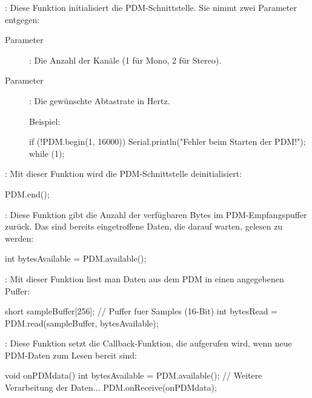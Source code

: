 \begin{description}
  \item []: Diese Funktion initialisiert die PDM-Schnittstelle. Sie nimmt zwei Parameter entgegen:
    \begin{description}
      \item[Parameter ]: Die Anzahl der Kanäle (1 für Mono, 2 für Stereo).
      \item[Parameter ]: Die gewünschte Abtastrate in Hertz.
      
       Beispiel:
       
 \begin{Arduino}
if (!PDM.begin(1, 16000)) {
    Serial.println("Fehler beim Starten der PDM!");
    while (1);
}
 \end{Arduino}      
    \end{description}

  \item []: Mit dieser Funktion wird die PDM-Schnittstelle deinitialisiert:
  
 \begin{Arduino}
PDM.end();
 \end{Arduino}      

  \item 
  
    \item [\PYTHON{available()}]: Diese Funktion gibt die Anzahl der verfügbaren Bytes im PDM-Empfangspuffer zurück. Das sind bereits eingetroffene Daten, die darauf warten, gelesen zu werden:

 \begin{Arduino}
int bytesAvailable = PDM.available();
 \end{Arduino}      
  
  \item [\PYTHON{read()}]: Mit dieser Funktion liest man Daten aus dem PDM in einen angegebenen Puffer:
  
 \begin{Arduino}
  short sampleBuffer[256]; // Puffer fuer Samples (16-Bit)
  int bytesRead = PDM.read(sampleBuffer, bytesAvailable);
 \end{Arduino}      
  
  \item [\PYTHON{onReceive()}]: Diese Funktion setzt die Callback-Funktion, die aufgerufen wird, wenn neue PDM-Daten zum Lesen bereit sind:
  
 \begin{Arduino}
void onPDMdata() {
      int bytesAvailable = PDM.available();
      // Weitere Verarbeitung der Daten...
  }
  PDM.onReceive(onPDMdata);
 \end{Arduino}      

    \end{description}



